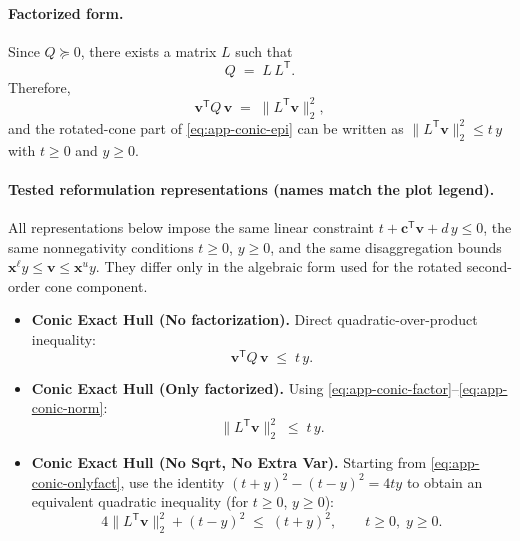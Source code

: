 \documentclass[11pt]{article}
\begin{document}
\begin{appendices}
\paragraph{Factorized form.}
Since $Q\succeq 0$, there exists a matrix $L$ such that
\begin{equation}
\label{eq:app-conic-factor}
Q \;=\; L\,L^{\mathsf T}.
\end{equation}
Therefore,
\begin{equation}
\label{eq:app-conic-norm}
\mathbf{v}^{\mathsf T}Q\,\mathbf{v} \;=\; \|L^{\mathsf T}\mathbf{v}\|_2^2,
\end{equation}
and the rotated-cone part of \eqref{eq:app-conic-epi} can be written as
$\|L^{\mathsf T}\mathbf{v}\|_2^2 \le t\,y$ with $t\ge 0$ and $y\ge 0$.

\paragraph{Tested reformulation representations (names match the plot legend).}
All representations below impose the same linear constraint
\(
t + \mathbf{c}^{\mathsf T}\mathbf{v} + d\,y \le 0
\),
the same nonnegativity conditions $t\ge 0$, $y\ge 0$, and the same disaggregation bounds
$\mathbf{x}^{\ell}y \le \mathbf{v} \le \mathbf{x}^{u}y$.
They differ only in the algebraic form used for the rotated second-order cone component.

\begin{itemize}
\item \textbf{Conic Exact Hull (No factorization).}
Direct quadratic-over-product inequality:
\begin{equation}
\label{eq:app-conic-nofact}
\mathbf{v}^{\mathsf T}Q\,\mathbf{v} \;\le\; t\,y.
\end{equation}

\item \textbf{Conic Exact Hull (Only factorized).}
Using \eqref{eq:app-conic-factor}--\eqref{eq:app-conic-norm}:
\begin{equation}
\label{eq:app-conic-onlyfact}
\|L^{\mathsf T}\mathbf{v}\|_2^2 \;\le\; t\,y.
\end{equation}

\item \textbf{Conic Exact Hull (No Sqrt, No Extra Var).}
Starting from \eqref{eq:app-conic-onlyfact}, use the identity
$(t+y)^2-(t-y)^2 = 4ty$ to obtain an equivalent quadratic inequality (for $t\ge 0$, $y\ge 0$):
\begin{equation}
\label{eq:app-conic-nosqrt-noextra}
4\|L^{\mathsf T}\mathbf{v}\|_2^2 + (t-y)^2 \;\le\; (t+y)^2,
\qquad t\ge 0,\; y\ge 0.
\end{equation}


\end{itemize}
\end{appendices}
\end{document}
